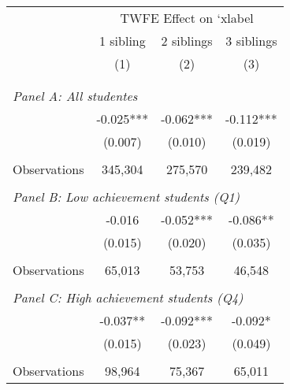 \makeatletter
{}
{
\makeatother
\begin{tabular}{lccc}
\toprule
\cmidrule(lr){2-4}
& \multicolumn{3}{c}{TWFE Effect on `xlabel} \\
\cmidrule(lr){2-4}
& 1 sibling & 2 siblings & 3 siblings  \\
\cmidrule(lr){2-2} \cmidrule(lr){3-3} \cmidrule(lr){4-4}
& (1) & (2) & (3)\\
\bottomrule
&  &  &  \\
&  &  &   \\
\multicolumn{4}{l}{\textit{Panel A: All studentes}} \\
\hspace{3mm}        &      -0.025***&      -0.062***&      -0.112***\\
                    &     (0.007)   &     (0.010)   &     (0.019)   \\
                    &               &               &               \\
\hspace{3mm}Observations&     345,304   &     275,570   &     239,482   \\
 
&  &  &   \\
\multicolumn{4}{l}{\textit{Panel B: Low achievement students (Q1)}} \\
\hspace{3mm}        &      -0.016   &      -0.052***&      -0.086** \\
                    &     (0.015)   &     (0.020)   &     (0.035)   \\
                    &               &               &               \\
\hspace{3mm}Observations&      65,013   &      53,753   &      46,548   \\
 
&  &  &   \\
\multicolumn{4}{l}{\textit{Panel C: High achievement students (Q4)}} \\
\hspace{3mm}        &      -0.037** &      -0.092***&      -0.092*  \\
                    &     (0.015)   &     (0.023)   &     (0.049)   \\
                    &               &               &               \\
\hspace{3mm}Observations&      98,964   &      75,367   &      65,011   \\
 

\end{tabular}}
